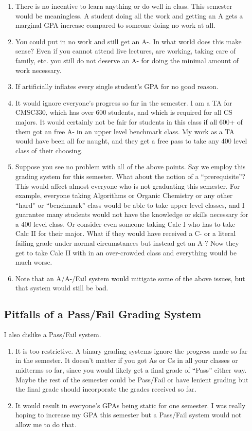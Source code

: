 \documentclass[12pt]{article}
\begin{document}
\begin{enumerate}
    \item There is no incentive to learn anything or do well in class. This semester would be meaningless. A student doing all the work and getting an A gets a marginal GPA increase compared to someone doing no work at all.
    \item You could put in no work and still get an A-. In what world does this make sense? Even if you cannot attend live lectures, are working, taking care of family, etc. you still do not deserve an A- for doing the minimal amount of work necessary.
    \item If artificially inflates every single student's GPA for no good reason.
    \item It would ignore everyone's progress so far in the semester. I am a TA for CMSC330, which has over 600 students, and which is required for all CS majors. It would certainly not be fair for students in this class if all 600+ of them got an free A- in an upper level benchmark class. My work as a TA would have been all for naught, and they get a free pass to take any 400 level class of their choosing.
    \item Suppose you see no problem with all of the above points. Say we employ this grading system for this semester. What about the notion of a ``prerequisite''? This would affect almost everyone who is not graduating this semester. For example, everyone taking Algorithms or Organic Chemistry or any other ``hard'' or ``benchmark'' class would be able to take upper-level classes, and I guarantee many students would not have the knowledge or skills necessary for a 400 level class. Or consider even someone taking Calc I who has to take Calc II for their major. What if they would have received a C- or a literal failing grade under normal circumstances but instead get an A-? Now they get to take Calc II with in an over-crowded class and everything would be much worse.
    \item Note that an A/A-/Fail system would mitigate some of the above issues, but that system would still be bad.
\end{enumerate}

\subsection{Pitfalls of a Pass/Fail Grading System}
I also dislike a Pass/Fail system.
\begin{enumerate}
    \item It is too restrictive. A binary grading systems ignore the progress made so far in the semester. It doesn't matter if you got As or Cs in all your classes or midterms so far, since you would likely get a final grade of ``Pass'' either way. Maybe the rest of the semester could be Pass/Fail or have lenient grading but the final grade should incorporate the grades received so far.
    \item It would result in everyone's GPAs being static for one semester. I was really hoping to increase my GPA this semester but a Pass/Fail system would not allow me to do that.
\end{enumerate}
\end{document}
